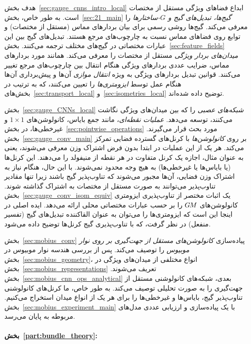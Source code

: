 هدف بخش~\ref{sec:gauge_cnns_intro_local} ابداع فضاهای ویژگی مستقل از مختصات است.
به طور خاص، بخش~\ref{sec:21_main} \emph{گیج‌ها، تبدیل‌های گیج و $G$-ساختارها} را معرفی می‌کند.
گیج‌ها روشی رسمی برای بیان بردارهای مماس (مستقل از مختصات) و توابع روی فضاهای مماس نسبت به چارچوب‌های مرجع هستند.
تبدیل‌های گیج بین این عبارات مختصاتی در گیج‌های مختلف ترجمه می‌کنند.
بخش~\ref{sec:feature_fields} \emph{میدان‌های بردار ویژگی} مستقل از مختصات را معرفی می‌کند.
همانند مورد بردارهای مماس، ضرایب عددی بردارهای ویژگی هنگام انتقال بین چارچوب‌های مرجع تغییر می‌کنند.
قوانین تبدیل بردارهای ویژگی به ویژه \emph{انتقال موازی} آن‌ها و پیش‌برداری آن‌ها هنگام عمل توسط \emph{ایزومتری‌ها} را تعیین می‌کنند، که به ترتیب در بخش‌های~\ref{sec:transport_local} و~\ref{sec:isometries_local} توضیح داده شده‌اند.

بخش~\ref{sec:gauge_CNNs_local} \emph{شبکه‌های عصبی} را که بین میدان‌های ویژگی نگاشت می‌کنند، توسعه می‌دهد.
\emph{عملیات نقطه‌ای}، مانند جمع بایاس، کانولوشن‌های $1\times1$ و غیرخطی‌ها، در بخش~\ref{sec:pointwise_operations} مورد بحث قرار می‌گیرند.
بخش~\ref{sec:gauge_conv_main} بر روی \emph{کانولوشن‌ها} با کرنل‌های گسترده فضایی تمرکز می‌کند.
هر یک از این عملیات در ابتدا بدون فرض اشتراک وزن معرفی می‌شوند، یعنی به عنوان مثال، اجازه یک کرنل متفاوت در هر نقطه از منیفولد را می‌دهند.
این کرنل‌ها (یا بایاس‌ها یا غیرخطی‌ها) به هیچ وجه محدود نمی‌شوند.
با این حال، هنگام نیاز به اشتراک وزن فضایی، آن‌ها مجبور می‌شوند که تناوب‌پذیر گیج باشند زیرا تنها مقادیر تناوب‌پذیر می‌توانند به صورت مستقل از مختصات به اشتراک گذاشته شوند.
بخش~\ref{sec:gauge_conv_isom_equiv} یک اثبات مختصر از تناوب‌پذیری ایزومتری کانولوشن‌های $G\mkern-1.4muM$ را بر حسب عبارات مختصاتی محلی ارائه می‌دهد.
ایده اصلی در اینجا این است که ایزومتری‌ها را می‌توان به عنوان القاکننده تبدیل‌های گیج (تفسیر منفعل) در نظر گرفت، که با تناوب‌پذیری گیج کرنل‌ها توضیح داده می‌شود.

بخش~\ref{sec:mobius_conv} پیاده‌سازی \emph{کانولوشن‌های مستقل از جهت‌گیری بر روی نوار موبیوس} را توصیف می‌کند.
پس از بررسی هندسه نوار موبیوس در بخش~\ref{sec:mobius_geometry}، انواع مختلفی از میدان‌های ویژگی در بخش~\ref{sec:mobius_representations} تعریف می‌شوند.
بخش~\ref{sec:mobius_cnn_ops_analytical} بعدی، شبکه‌های کانولوشنی مستقل از جهت‌گیری را به صورت تحلیلی توصیف می‌کند.
به طور خاص، ما کرنل‌های کانولوشنی تناوب‌پذیر گیج، بایاس‌ها و غیرخطی‌ها را برای هر یک از انواع میدان استخراج می‌کنیم.
بخش~\ref{sec:mobius_experiment_main} با یک پیاده‌سازی و ارزیابی عددی مدل‌های مربوطه به پایان می‌رسد.


\paragraph{بخش~\ref{part:bundle_theory}:}

